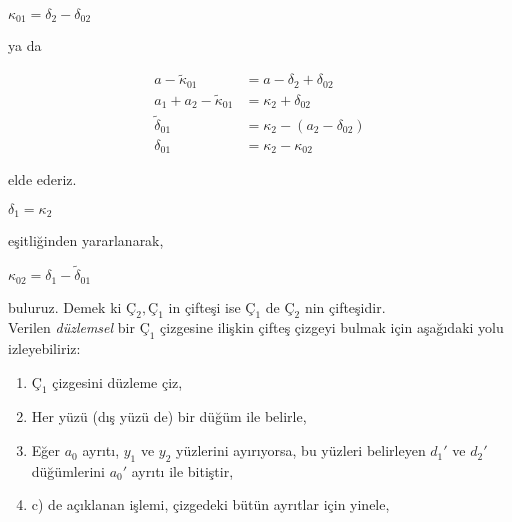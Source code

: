 \documentclass[11pt]{amsbook}
\begin{document}
	
	
	\begin{center}
	$\kappa_{01}=\delta_{2} - \delta_{02}$
	\end{center}
	
	ya da 
	
	\begin{align*} 
	a - \tilde{\kappa}_{01} &=  a - \delta_{2} + \delta_{02} \\ 
	a_{1} + a_{2} - \tilde{\kappa}_{01} &=  \kappa_{2} + \delta_{02} \\
	\tilde{\delta}_{01} &=  \kappa_{2} - (a_{2} - \delta_{02}) \\
	\delta_{01} &=  \kappa_{2} - \kappa_{02} 
	\end{align*}
	
	elde ederiz.
	
	\begin{center}
	$\delta_{1} = \kappa_{2}$
	\end{center}
	
	eşitliğinden yararlanarak,
	
	\begin{center}
	$\kappa_{02} = \delta_{1} - \tilde{\delta}_{01} $
	\end{center}

buluruz. Demek ki $Ç_{2}, Ç_{1}$ in çifteşi ise $Ç_{1}$ de $Ç_{2}$ nin çifteşidir.
\\

Verilen  \textit{düzlemsel} bir $Ç_{1}$ çizgesine ilişkin çifteş çizgeyi bulmak için aşağıdaki yolu izleyebiliriz:

\begin{enumerate}[label=(\alph*)]
	
	\item $Ç_{1}$ çizgesini düzleme çiz,
	\item Her yüzü (dış yüzü de) bir düğüm ile belirle,
	\item Eğer $a_{0}$ ayrıtı, $y_{1}$ ve $y_{2}$ yüzlerini ayırıyorsa,	bu yüzleri belirleyen ${d_{1}}'$ ve ${d_{2}}'$ düğümlerini ${a_{0}}'$	ayrıtı ile bitiştir, 
	\item  c) de açıklanan işlemi, çizgedeki bütün ayrıtlar için yinele, 
		
\end{enumerate}

	
\end{document}
